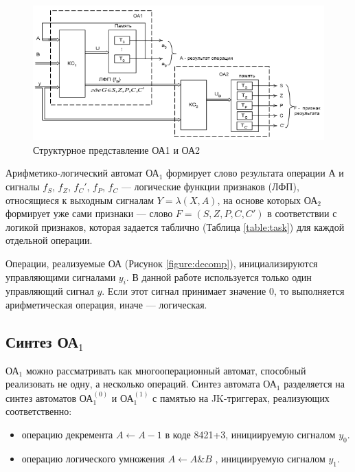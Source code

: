 \begin{figure}[H]
	\includegraphics[scale=0.6]{images/4.png}
	\caption{Структурное представление ОА1 и ОА2}
	\label{figure:srtuct}
\end{figure}

Арифметико-логический автомат ОА$_1$ формирует слово результата операции $А$ и сигналы $f_S$, $f_Z$, $f_C'$, $f_P$, $f_C$ --- логические функции признаков (ЛФП), относящиеся к выходным сигналам $Y=\lambda(X, A)$, на основе которых ОА$_2$ формирует уже сами признаки --- слово $F = (S, Z, P, C, C')$ в соответствии с логикой признаков, которая задается таблично (Таблица \ref{table:task}) для каждой отдельной операции.

Операции, реализуемые ОА (Рисунок \ref{figure:decomp}), инициализируются управляющими сигналами $y_i$. В данной работе используется только один управляющий сигнал $y$. Если этот сигнал принимает значение $0$, то выполняется арифметическая операция, иначе --- логическая.

\subsection{Синтез ОА${}_1$}


ОА$_1$ можно рассматривать как многооперационный автомат, способный реализовать не одну, а несколько операций. Синтез автомата ОА$_1$ разделяется на синтез автоматов ОА$^{(0)}_{1}$ и ОА$^{(1)}_{1}$ с памятью на  JK-триггерах, реализующих соответственно: 

\begin{itemize}
	\item операцию декремента $A \leftarrow A-1$ в коде 8421+3, инициируемую сигналом $y_0$.
	\item операцию логического умножения $A \leftarrow A \& B$ , инициируемую сигналом $y_1$.

\end{itemize}

